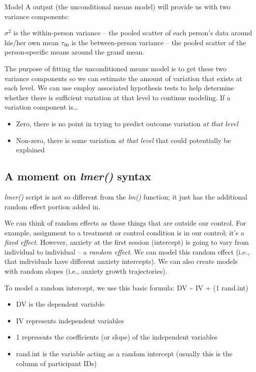 \documentclass[
  11pt,
]{book}
\providecommand{\tightlist}{%
  \setlength{\itemsep}{0pt}\setlength{\parskip}{0pt}}
\begin{document}
Model A output (the unconditional means model) will provide us with two variance components:

\(\sigma^2\) is the within-person variance -- the pooled scatter of each person's data around his/her own mean
\(\tau_{00}\) is the between-person variance -- the pooled scatter of the person-specific means around the grand mean.

The purpose of fitting the unconditioned means model is to get these two variance components so we can estimate the amount of variation that exists at each level. We can use employ associated hypothesis tests to help determine whether there is sufficient variation at that level to continue modeling. If a variation component is\ldots{}

\begin{itemize}
\tightlist
\item
  Zero, there is no point in trying to predict outcome variation \emph{at that level}
\item
  Non-zero, there is some variation \emph{at that level} that could potentially be explained
\end{itemize}

\hypertarget{a-moment-on-lmer-syntax}{%
\subsection{\texorpdfstring{A moment on \emph{lmer()} syntax}{A moment on lmer() syntax}}\label{a-moment-on-lmer-syntax}}

\emph{lmer()} script is not so different from the \emph{lm()} function; it just has the additional random effect portion added in.

We can think of random effects as those things that are outside our control. For example, assignment to a treatment or control condition is in our control; it's a \emph{fixed effect}. However, anxiety at the first session (intercept) is going to vary from individual to individual -- a \emph{random effect}. We can model this random effect (i.e., that individuals have different anxiety intercepts). We can also create models with random slopes (i.e., anxiety growth trajectories).

To model a random intercept, we use this basic formula: DV \textasciitilde{} IV + (1 \textbar{} rand.int)

\begin{itemize}
\tightlist
\item
  DV is the dependent variable
\item
  IV represents independent variables
\item
  1 represents the coefficients (or slope) of the independent variables
\item
  rand.int is the variable acting as a random intercept (usually this is the column of participant IDs)
\end{itemize}
\end{document}
